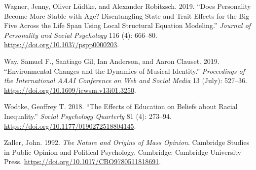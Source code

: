 \documentclass[
  12pt,
]{article}
\newlength{\cslhangindent}
\newlength{\cslentryspacingunit} %
\newenvironment{CSLReferences}[2] %
 {%
  \setlength{\parindent}{0pt}
  \ifodd #1
  \let\oldpar\par
  \def\par{\hangindent=\cslhangindent\oldpar}
  \fi
  \setlength{\parskip}{#2\cslentryspacingunit}
 }%
 {}
\begin{document}
\begin{CSLReferences}{1}{0}
\leavevmode{}%
Wagner, Jenny, Oliver Lüdtke, and Alexander Robitzsch. 2019. {``Does Personality Become More Stable with Age? {Disentangling} State and Trait Effects for the Big Five Across the Life Span Using Local Structural Equation Modeling.''} \emph{Journal of Personality and Social Psychology} 116 (4): 666--80. \url{https://doi.org/10.1037/pspp0000203}.

\leavevmode{}%
Way, Samuel F., Santiago Gil, Ian Anderson, and Aaron Clauset. 2019. {``Environmental {Changes} and the {Dynamics} of {Musical} {Identity}.''} \emph{Proceedings of the International AAAI Conference on Web and Social Media} 13 (July): 527--36. \url{https://doi.org/10.1609/icwsm.v13i01.3250}.

\leavevmode{}%
Wodtke, Geoffrey T. 2018. {``The {Effects} of {Education} on {Beliefs} about {Racial} {Inequality}.''} \emph{Social Psychology Quarterly} 81 (4): 273--94. \url{https://doi.org/10.1177/0190272518804145}.

\leavevmode{}%
Zaller, John. 1992. \emph{The {Nature} and {Origins} of {Mass} {Opinion}}. Cambridge {Studies} in {Public} {Opinion} and {Political} {Psychology}. Cambridge: Cambridge University Press. \url{https://doi.org/10.1017/CBO9780511818691}.

\end{CSLReferences}
\end{document}
